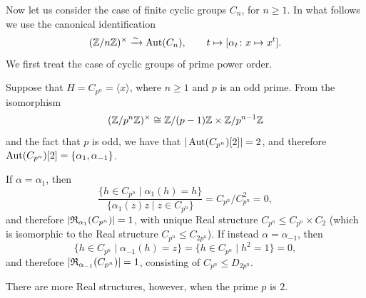 Now let us consider the case of finite cyclic groups $C_n$, for $n \geq 1$. In what follows we use the canonical identification
\[
({\mathbb Z} / n {\mathbb Z})^{\times} \xrightarrow{\sim} \operatorname{Aut}(C_{n}), \qquad t \mapsto [\alpha_t \colon x \mapsto x^t].
\]
We first treat the case of cyclic groups of prime power order.

\begin{eg}\label{eg:RealStructuresOddPrimePower}
Suppose that $H = C_{p^n} = \langle x \rangle$, where $n \geq 1$ and $p$ is an odd prime. From the isomorphism
\[
({\mathbb Z} / p^n {\mathbb Z})^{\times} \cong {\mathbb Z} / (p-1) {\mathbb Z} \times {\mathbb Z} / p^{n-1} {\mathbb Z}
\]
and the fact that $p$ is odd, we have that $|\operatorname{Aut}(C_{p^n})[2]| = 2$, and therefore $\operatorname{Aut}(C_{p^n})[2] = \{\alpha_1, \alpha_{-1}\}$. 

If $\alpha = \alpha_1$, then 
\[
\frac{\{h \in C_{p^n} \mid \alpha_1(h) = h\}}{\{\alpha_1(z)z \mid z \in C_{p^n}\}} = C_{p^n} / C_{p^n}^2 = 0,
\]
and therefore $|{\mathfrak R}_{\alpha_1}(C_{p^n})| = 1$, with unique Real structure $C_{p^n} \leq C_{p^n} \times C_2$ (which is isomorphic to the Real structure $C_{p^n} \leq C_{2 p^n}$). If instead $\alpha = \alpha_{-1}$, then
\[
\{h \in C_{p^n} \mid \alpha_{-1}(h) = z\} = \{h \in C_{p^n} \mid h^2 = 1\} = 0,
\]
and therefore $|{\mathfrak R}_{\alpha_{-1}}(C_{p^n})| = 1$, consisting of $C_{p^n} \leq D_{2p^n}$.
\end{eg}

There are more Real structures, however, when the prime $p$ is $2$.

